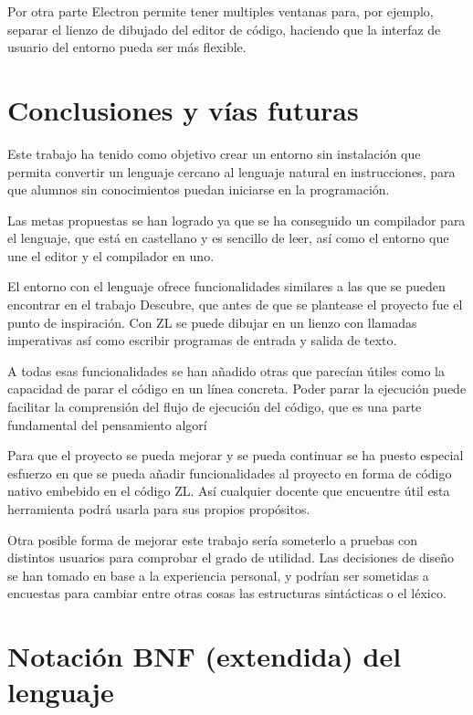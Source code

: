 \documentclass{report}
\begin{document}
	Por otra parte Electron permite tener multiples ventanas para, por ejemplo, separar el lienzo de dibujado del editor de código, haciendo que la interfaz de usuario del entorno pueda ser más flexible. 
	
	\chapter{Conclusiones y vías futuras}
	
	Este trabajo ha tenido como objetivo crear un entorno sin instalación que permita convertir un lenguaje cercano al lenguaje natural en instrucciones, para que alumnos sin conocimientos puedan iniciarse en la programación. 
	
	Las metas propuestas se han logrado ya que se ha conseguido un compilador para el lenguaje, que está en castellano y es sencillo de leer, así como el entorno que une el editor y el compilador en uno. 
	
	El entorno con el lenguaje ofrece funcionalidades similares a las que se pueden encontrar en el trabajo Descubre, que antes de que se plantease el proyecto fue el punto de inspiración. Con ZL se puede dibujar en un lienzo con llamadas imperativas así como escribir programas de entrada y salida de texto. 
	
	A todas esas funcionalidades se han añadido otras que parecían útiles como la capacidad de parar el código en un línea concreta. Poder parar la ejecución puede facilitar la comprensión del flujo de ejecución del código, que es una parte fundamental del pensamiento algorí 
	
	Para que el proyecto se pueda mejorar y se pueda continuar se ha puesto especial esfuerzo en que se pueda añadir funcionalidades al proyecto en forma de código nativo embebido en el código ZL. Así cualquier docente que encuentre útil esta herramienta podrá usarla para sus propios propósitos. 
	
	Otra posible forma de mejorar este trabajo sería someterlo a pruebas con distintos usuarios para comprobar el grado de utilidad. Las decisiones de diseño se han tomado en base a la experiencia personal, y podrían ser sometidas a encuestas para cambiar entre otras cosas las estructuras sintácticas o el léxico. 
	 
	
	 
	
	

	\appendix
	\chapter{Notación BNF (extendida) del lenguaje} \label{app:a}
	
\end{document}
